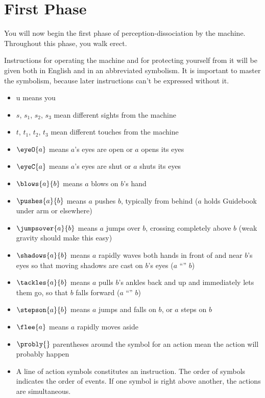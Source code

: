   \vfill

\clearpage


\clearpage
{}
\section{First Phase}
You will now begin the first phase of perception-dissociation by the 
machine. Throughout this phase, you walk erect. 

Instructions for operating the machine and for protecting yourself from 
it will be given both in English and in an abbreviated symbolism. It is 
important to master the symbolism, because later instructions can't be 
expressed without it. 

\begin{itemize}
\item u means you 

\item $s$, $s_1$, $s_2$, $s_3$ mean different sights from the machine 

\item $t$, $t_1$, $t_2$, $t_3$ mean different touches from the machine 

\item $\eyeO{a}$ means $a$'s eyes are open or $a$ opens its eyes 

\item $\eyeC{a}$ means $a$'s eyes are shut or $a$ shuts its eyes 

\item $\blows{a}{b}$ means $a$ blows on $b$'s hand 

\item $\pushes{a}{b}$ means $a$ pushes $b$, typically from behind 
($a$ holds Guidebook under arm or elsewhere) 

\item $\jumpsover{a}{b}$ means $a$ jumps over $b$, crossing completely above $b$ (weak gravity should make this easy) 

\item $\shadows{a}{b}$ means $a$ rapidly waves both hands in front of and near $b$'s eyes so that 
	moving shadows are cast on $b$'s eyes ($a$ \enquote{} $b$) 

\item $\tackles{a}{b}$ means $a$ pulls $b$'s ankles back and up and immediately lets them go, so 
	that $b$ falls forward ($a$ \enquote{} $b$) 

\item $\stepson{a}{b}$ means $a$ jumps and falls on $b$, or $a$ steps on $b$ 

\item $\flee{a}$ means $a$ rapidly moves aside 

\item $\probly{}$ parentheses around the symbol for an action mean the action will 
probably happen 

\item A line of action symbols constitutes an instruction. The order of symbols 
indicates the order of events. If one symbol is right above another, the 
actions are simultaneous. 
\end{itemize}

